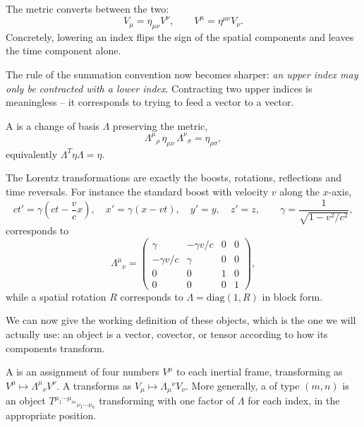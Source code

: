 \documentclass[a4paper]{scrartcl}
\begin{document}
\begin{definition}
	The metric converts between the two:
	$$
	V_\mu = \eta_{\mu\nu}V^\nu, \qquad V^\mu = \eta^{\mu\nu}V_\nu.
	$$
	Concretely, lowering an index flips the sign of the spatial components and leaves the time component alone.
\end{definition}

The rule of the summation convention now becomes sharper: \emph{an upper index may only be contracted with a lower index}. Contracting two upper indices is meaningless -- it corresponds to trying to feed a vector to a vector.

\begin{definition}
	A  is a change of basis $\Lambda$ preserving the metric,
	$$
	\Lambda^\mu{}_{\rho}\, \eta_{\mu\nu}\, \Lambda^\nu{}_{\sigma} = \eta_{\rho\sigma},
	$$
	equivalently $\Lambda^T \eta \Lambda = \eta$.
\end{definition}

The Lorentz transformations are exactly the boosts, rotations, reflections and time reversals. For instance the standard boost with velocity $v$ along the $x$-axis,
$$
ct' = \gamma\left(ct - \frac{v}{c}x\right), \quad x' = \gamma(x - vt), \quad y'=y,\quad z'=z, \qquad \gamma = \frac{1}{\sqrt{1-v^2/c^2}},
$$
corresponds to
$$
\Lambda^\mu{}_\nu = \begin{pmatrix} \gamma & -\gamma v/c & 0 & 0\\ -\gamma v/c & \gamma & 0&0\\ 0&0&1&0\\0&0&0&1\end{pmatrix},
$$
while a spatial rotation $R$ corresponds to $\Lambda = \mathrm{diag}(1, R)$ in block form.

We can now give the working definition of these objects, which is the one we will actually use: an object is a vector, covector, or tensor according to how its components transform.

\begin{definition}
	A  is an assignment of four numbers $V^\mu$ to each inertial frame, transforming as $V^\mu \mapsto \Lambda^\mu{}_\nu V^\nu$. A  transforms as $V_\mu \mapsto \Lambda_\mu{}^\nu V_\nu$. More generally, a  of type $(m,n)$ is an object $T^{\mu_1\cdots\mu_m}{}_{\nu_1\cdots\nu_n}$ transforming with one factor of $\Lambda$ for each index, in the appropriate position.
\end{definition}
\end{document}
